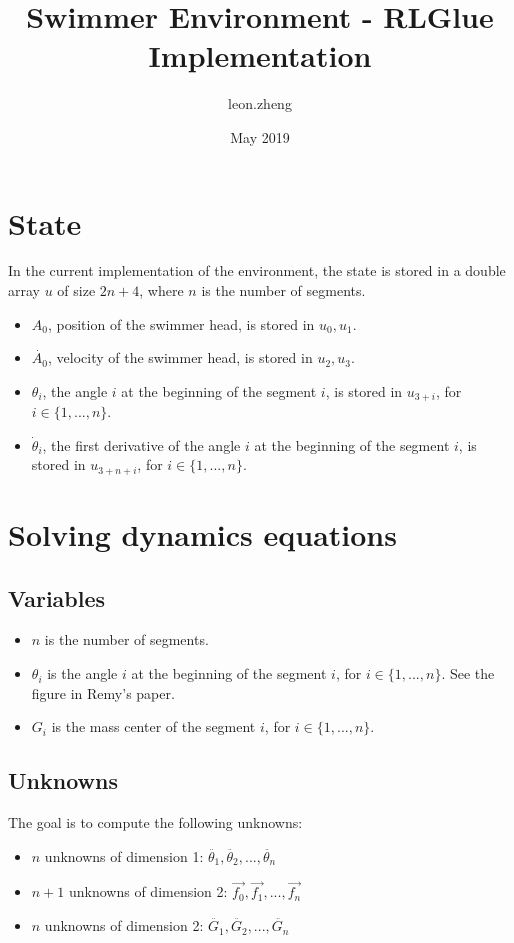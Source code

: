 \documentclass{article}
\title{Swimmer Environment - RLGlue Implementation}
\author{leon.zheng }
\date{May 2019}
\begin{document}
\maketitle

\section{State}

In the current implementation of the environment, the state is stored in a double array $u$ of size $2n+4$, where $n$ is the number of segments.
\begin{itemize}
    \item $A_0$, position of the swimmer head, is stored in $u_0, u_1$.
    \item $\dot{A_0}$, velocity of the swimmer head, is stored in $u_2, u_3$.
    \item $\theta_i$, the angle $i$ at the beginning of the segment $i$, is stored in $u_{3+i}$, for $i \in \{1, ..., n\}$.
    \item $\dot{\theta}_i$, the first derivative of the angle $i$ at the beginning of the segment $i$, is stored in $u_{3+n+i}$, for $i \in \{1, ..., n\}$.
\end{itemize}

\section{Solving dynamics equations}

\subsection{Variables}
\begin{itemize}
    \item $n$ is the number of segments.
    \item $\theta_i$ is the angle $i$ at the beginning of the segment $i$, for $i \in \{1, ..., n\}$. See the figure in Remy's paper.
    \item $G_i$ is the mass center of the segment $i$, for $i \in \{1, ..., n\}$.
\end{itemize}

\subsection{Unknowns}
The goal is to compute the following unknowns:
\begin{itemize}
  \item $n$ unknowns of dimension 1: $\ddot{\theta_1}, \ddot{\theta_2}, ... , \ddot{\theta_n}$
  \item $n+1$ unknowns of dimension 2: $\vec{f_0}, \vec{f_1}, ..., \vec{f_n}$
  \item $n$ unknowns of dimension 2: $\ddot{G_1}, \ddot{G_2}, ..., \ddot{G_n}$
\end{itemize}
\end{document}
